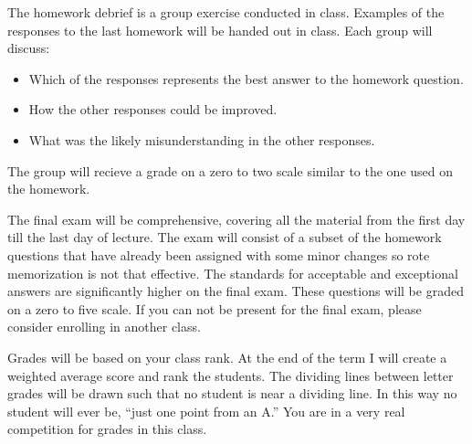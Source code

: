 \documentclass[letterpaper,10pt]{article}
\begin{document}
The homework debrief is a group exercise conducted in class. Examples of the responses to the last homework will be handed out in class.  Each group will discuss:

\begin{itemize}
\item Which of the responses represents the best answer to the homework question.
\item How the other responses could be improved.
\item What was the likely misunderstanding in the other responses.
\end{itemize}

The group will recieve a grade on a zero to two scale similar to the one used on the homework.

The final exam will be comprehensive, covering all the material from the first day till the last day of lecture. The exam will consist of a subset of the homework questions that have already been assigned with some minor changes so rote memorization is not that effective.  The standards for acceptable and exceptional answers are significantly higher on the final exam.  These questions will be graded on a zero to five scale.  If you can not be present for the final exam, please consider enrolling in another class.


Grades will be based on your class rank. At the end of the term I will
create a weighted average score and rank the students. The dividing
lines between letter grades will be drawn such that no student is near
a dividing line. In this way no student will ever be, ``just one point
from an A.'' You are in a very real competition for grades in this
class. 
\end{document}
